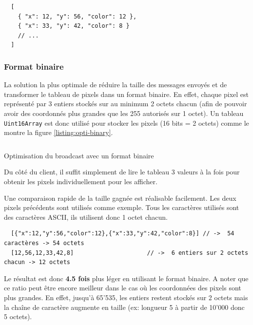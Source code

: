 \begin{verbatim}
  [
    { "x": 12, "y": 56, "color": 12 },
    { "x": 33, "y": 42, "color": 8 }
    // ...
  ]
\end{verbatim}

\subsubsection{Format binaire}

La solution la plus optimale de réduire la taille des messages envoyés et de transformer le tableau de pixels dans un format binaire. En effet, chaque pixel est représenté par 3 entiers stockés sur au minimum 2 octets chacun (afin de pouvoir avoir des coordonnés plus grandes que les 255 autorisés sur 1 octet). Un tableau \texttt{Uint16Array} est donc utilisé pour stocker les pixels (16 bits = 2 octets) comme le montre la figure \ref{listing:opti-binary}.

\begin{listing}[H]
  \inputminted[highlightlines={9}]{ts}{assets/figures/opti-binary.ts}
  \caption{Optimisation du broadcast avec un format binaire}
  \label{listing:opti-binary}
\end{listing}

Du côté du client, il suffit simplement de lire le tableau 3 valeurs à la fois pour obtenir les pixels individuellement pour les afficher.

Une comparaison rapide de la taille gagnée est réalisable facilement. Les deux pixels précédents sont utilisés comme exemple. Tous les caractères utilisés sont des caractères ASCII, ils utilisent donc 1 octet chacun.

\begin{verbatim}
  [{"x":12,"y":56,"color":12},{"x":33,"y":42,"color":8}] // ->  54 caractères -> 54 octets
  [12,56,12,33,42,8]                     // ->  6 entiers sur 2 octets chacun -> 12 octets
\end{verbatim}

Le résultat est donc \textbf{4.5 fois} plus léger en utilisant le format binaire. A noter que ce ratio peut être encore meilleur dans le cas où les coordonnées des pixels sont plus grandes. En effet, jusqu'à 65'535, les entiers restent stockés sur 2 octets mais la chaîne de caractère augmente en taille (ex: longueur 5 à partir de 10'000 donc 5 octets).



